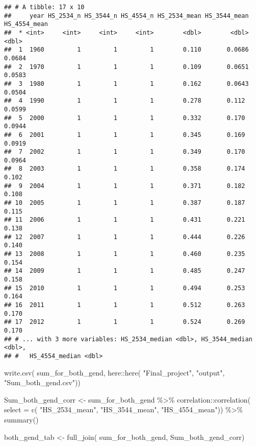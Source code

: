 \documentclass[
]{article}
\newenvironment{Shaded}{\begin{snugshade}}{\end{snugshade}}
\newcommand{\AttributeTok}[1]{\textcolor[rgb]{0.77,0.63,0.00}{#1}}
\newcommand{\FunctionTok}[1]{\textcolor[rgb]{0.00,0.00,0.00}{#1}}
\newcommand{\NormalTok}[1]{#1}
\newcommand{\OtherTok}[1]{\textcolor[rgb]{0.56,0.35,0.01}{#1}}
\newcommand{\SpecialCharTok}[1]{\textcolor[rgb]{0.00,0.00,0.00}{#1}}
\newcommand{\StringTok}[1]{\textcolor[rgb]{0.31,0.60,0.02}{#1}}
\begin{document}
\begin{verbatim}
## # A tibble: 17 x 10
##     year HS_2534_n HS_3544_n HS_4554_n HS_2534_mean HS_3544_mean HS_4554_mean
##  * <int>     <int>     <int>     <int>        <dbl>        <dbl>        <dbl>
##  1  1960         1         1         1        0.110       0.0686       0.0684
##  2  1970         1         1         1        0.109       0.0651       0.0583
##  3  1980         1         1         1        0.162       0.0643       0.0504
##  4  1990         1         1         1        0.278       0.112        0.0599
##  5  2000         1         1         1        0.332       0.170        0.0944
##  6  2001         1         1         1        0.345       0.169        0.0919
##  7  2002         1         1         1        0.349       0.170        0.0964
##  8  2003         1         1         1        0.358       0.174        0.102 
##  9  2004         1         1         1        0.371       0.182        0.108 
## 10  2005         1         1         1        0.387       0.187        0.115 
## 11  2006         1         1         1        0.431       0.221        0.138 
## 12  2007         1         1         1        0.444       0.226        0.140 
## 13  2008         1         1         1        0.460       0.235        0.154 
## 14  2009         1         1         1        0.485       0.247        0.158 
## 15  2010         1         1         1        0.494       0.253        0.164 
## 16  2011         1         1         1        0.512       0.263        0.170 
## 17  2012         1         1         1        0.524       0.269        0.170 
## # ... with 3 more variables: HS_2534_median <dbl>, HS_3544_median <dbl>,
## #   HS_4554_median <dbl>
\end{verbatim}

\begin{Shaded}
\begin{Highlighting}[]
\FunctionTok{write.csv}\NormalTok{(}
\NormalTok{  sum\_for\_both\_gend,}
\NormalTok{          here}\SpecialCharTok{::}\FunctionTok{here}\NormalTok{(}
            \StringTok{"Final\_project"}\NormalTok{,}
            \StringTok{"output"}\NormalTok{,}
            \StringTok{"Sum\_both\_gend.csv"}\NormalTok{))}
\end{Highlighting}
\end{Shaded}

\begin{Shaded}
\begin{Highlighting}[]
\NormalTok{Sum\_both\_gend\_corr }\OtherTok{\textless{}{-}}\NormalTok{ sum\_for\_both\_gend }\SpecialCharTok{\%\textgreater{}\%} 
\NormalTok{  correlation}\SpecialCharTok{::}\FunctionTok{correlation}\NormalTok{(}
    \AttributeTok{select =} \FunctionTok{c}\NormalTok{(}
      \StringTok{"HS\_2534\_mean"}\NormalTok{,}
      \StringTok{"HS\_3544\_mean"}\NormalTok{,}
      \StringTok{"HS\_4554\_mean"}\NormalTok{)) }\SpecialCharTok{\%\textgreater{}\%} 
  \FunctionTok{summary}\NormalTok{()}

\NormalTok{both\_gend\_tab }\OtherTok{\textless{}{-}} \FunctionTok{full\_join}\NormalTok{(}
\NormalTok{  sum\_for\_both\_gend,}
\NormalTok{  Sum\_both\_gend\_corr)}
\end{Highlighting}
\end{Shaded}
\end{document}
